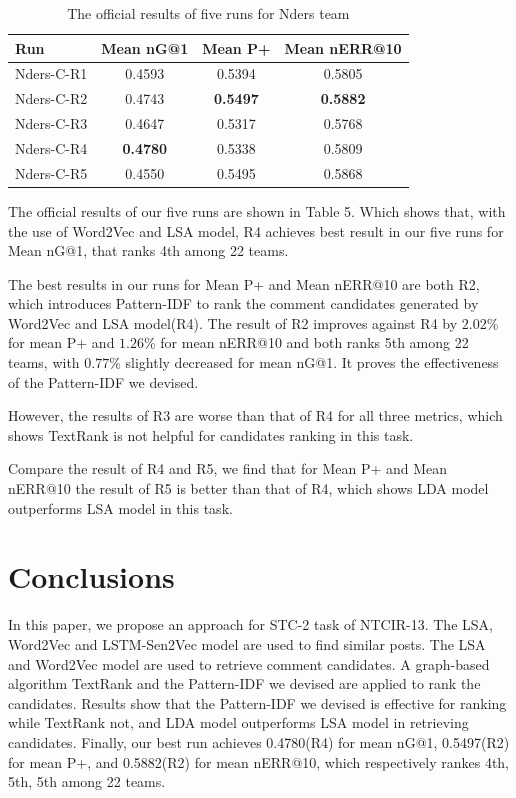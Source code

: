 \documentclass{sig-alternate}
\begin{document}
\begin{table}
\centering
\caption{The official results of five runs for Nders team}
\label{tab:commands}
\begin{minipage}{\columnwidth}
\begin{center}
\begin{tabular}{|l|c|c|c|}
\hline
 Run        &  Mean nG@1  &  Mean P+  &  Mean nERR@10  \\ \hline
 Nders-C-R1 & 0.4593 & 0.5394 & 0.5805 \\ \hline
 Nders-C-R2 & 0.4743 & \textbf{0.5497} & \textbf{0.5882} \\ \hline
 Nders-C-R3 & 0.4647 & 0.5317 & 0.5768 \\ \hline
 Nders-C-R4 & \textbf{0.4780} & 0.5338 & 0.5809 \\ \hline
 Nders-C-R5 & 0.4550 & 0.5495 & 0.5868 \\ \hline
\end{tabular}
\end{center}
\end{minipage}
\end{table}

The official results of our five runs are shown in Table 5. Which shows 
that, with the use of Word2Vec and LSA model, R4 achieves 
best result in our five runs for Mean nG@1, that ranks 4th among 22 teams. 

The best results in our runs for Mean P+ and Mean nERR@10 are both R2, 
which introduces Pattern-IDF to rank the comment candidates generated by 
Word2Vec and LSA model(R4). The result of R2 improves against R4 by $2.02\%$ for mean P+ and $1.26\%$ for mean nERR@10 and both ranks 5th among 22 teams, with $0.77\%$ slightly decreased for mean nG@1. It proves the 
effectiveness of the Pattern-IDF we devised. 

However, the results of R3 are worse than that of R4 for all three metrics, 
which shows TextRank is not helpful for candidates ranking in this task.

Compare the result of R4 and R5, we find that for Mean P+ and Mean nERR@10 the 
result of R5 is better than that of R4, which shows LDA model outperforms LSA 
model in this task.

\section{Conclusions}
In this paper, we propose an approach for STC-2 task of NTCIR-13. The LSA,
Word2Vec and LSTM-Sen2Vec model are used to find similar posts. The LSA and Word2Vec 
model are used to retrieve comment candidates. A graph-based algorithm TextRank 
and the Pattern-IDF we devised are applied to rank the candidates. Results show 
that the Pattern-IDF we devised is effective for ranking while TextRank not, 
and LDA model outperforms LSA model in retrieving candidates. Finally, our best 
run achieves 0.4780(R4) for mean nG@1, 0.5497(R2) for mean P+, and 0.5882(R2) for 
mean nERR@10, which respectively rankes 4th, 5th, 5th among 22 teams. 
\end{document}
